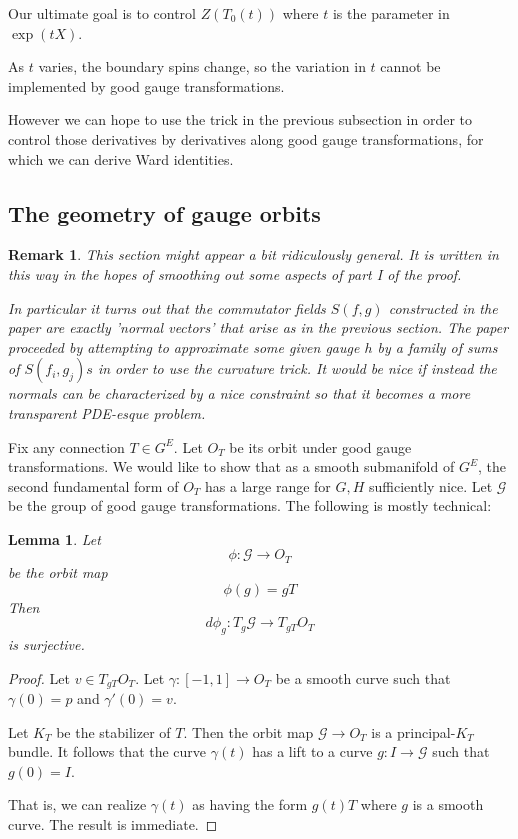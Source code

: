 \documentclass[11pt]{amsart}
\numberwithin{theorem}{subsection}
\newtheorem{lemma}{Lemma}
\numberwithin{lemma}{subsection}
\numberwithin{corollary}{subsection}
\numberwithin{definition}{subsection}
\newtheorem{rmk}{Remark}
\numberwithin{prop}{subsection}
\begin{document}
Our ultimate goal is to control $Z(T_0(t))$ where $t$ is the parameter in $\exp(tX)$.

As $t$ varies, the boundary spins change, so the variation in $t$ cannot be implemented by good gauge transformations.

However we can hope to use the trick in the previous subsection in order to control those derivatives by derivatives along good gauge transformations, for which we can derive Ward identities.



\subsection{The geometry of gauge orbits}
\begin{rmk} 
  This section might appear a bit ridiculously general. It is written in this way in the hopes of smoothing out some aspects of part I of the proof.

  In particular it turns out that the commutator fields $S(f,g)$ constructed in the paper are exactly 'normal vectors' that arise as in the previous section.
  The paper proceeded by attempting to approximate some given gauge $h$ by a family of sums of $S(f_i, g_j)s$
  in order to use the curvature trick. It would be nice if instead the normals can be characterized by a nice constraint so that it becomes a more transparent PDE-esque problem.
\end{rmk}
Fix any connection $T\in G^E$. Let $O_T$ be its orbit under good gauge transformations. We would like to show 
that as a smooth submanifold of $G^E$, the second fundamental form of $O_T$ has a large range for $G,H$ sufficiently nice.
Let $\mathcal{G}$ be the group of good gauge transformations. The following is mostly technical:
\begin{lemma}
Let \[\phi:\mathcal{G}\to O_T\]
be the orbit map 
\[\phi(g)=gT\]
Then 
\[d\phi_g:T_g\mathcal{G}\to T_{gT}O_T\]
is surjective.
\end{lemma}
\begin{proof}
Let $v\in T_{gT}O_T$. Let $\gamma:[-1,1]\to O_T$ be a smooth curve such that $\gamma(0)=p$ and $\gamma'(0)=v$.


Let $K_T$ be the stabilizer of $T$. Then the orbit map $\mathcal{G}\to O_T$ is a principal-$K_T$ bundle. 
It follows that the curve $\gamma(t)$ has a lift to a curve $g: I\to \mathcal{G}$
such that $g(0)= I$.

That is, we can realize $\gamma(t)$ as having the form $g(t)T$ where $g$ is a smooth curve.
The result is immediate.
\end{proof}
\end{document}
